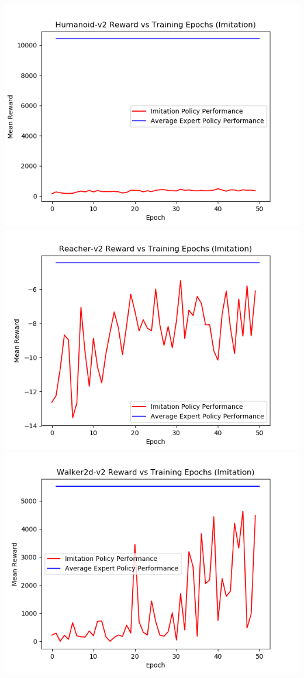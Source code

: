 \documentclass{article}
\begin{document}
    \includegraphics[scale=0.4]{Humanoid-v2Imitation}\\
    \includegraphics[scale=0.4]{Reacher-v2Imitation}
    \includegraphics[scale=0.4]{Walker2d-v2Imitation}\\
\end{document}

